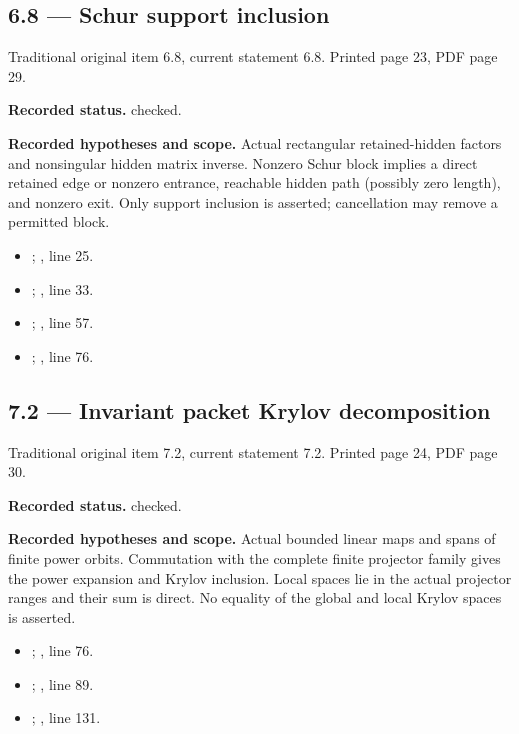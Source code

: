 \subsection{6.8 — Schur support inclusion}
\label{result:6.8}
{\footnotesize\color{muted}Traditional original item 6.8, current statement 6.8. Printed page 23, PDF page 29.}\par
\textbf{Recorded status.} checked.

\textbf{Recorded hypotheses and scope.} Actual rectangular retained-hidden factors and nonsingular hidden matrix inverse. Nonzero Schur block implies a direct retained edge or nonzero entrance, reachable hidden path (possibly zero length), and nonzero exit. Only support inclusion is asserted; cancellation may remove a permitted block.

\begin{itemize}
\item {}; , line 25.
\item {}; , line 33.
\item {}; , line 57.
\item {}; , line 76.
\end{itemize}
\subsection{7.2 — Invariant packet Krylov decomposition}
\label{result:7.2}
{\footnotesize\color{muted}Traditional original item 7.2, current statement 7.2. Printed page 24, PDF page 30.}\par
\textbf{Recorded status.} checked.

\textbf{Recorded hypotheses and scope.} Actual bounded linear maps and spans of finite power orbits. Commutation with the complete finite projector family gives the power expansion and Krylov inclusion. Local spaces lie in the actual projector ranges and their sum is direct. No equality of the global and local Krylov spaces is asserted.

\begin{itemize}
\item {}; , line 76.
\item {}; , line 89.
\item {}; , line 131.
\end{itemize}

